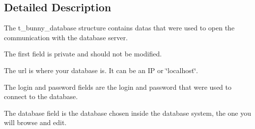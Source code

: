 \subsection{Detailed Description}
The t\-\_\-bunny\-\_\-database structure contains datas that were used to open the communication with the database server.
\begin{DoxyItemize}
\item The first field is private and should not be modified.
\item The url is where your database is. It can be an I\-P or \char`\"{}localhost\char`\"{}.
\item The login and password fields are the login and password that were used to connect to the database.
\item The database field is the database chosen inside the database system, the one you will browse and edit. 
\end{DoxyItemize}

